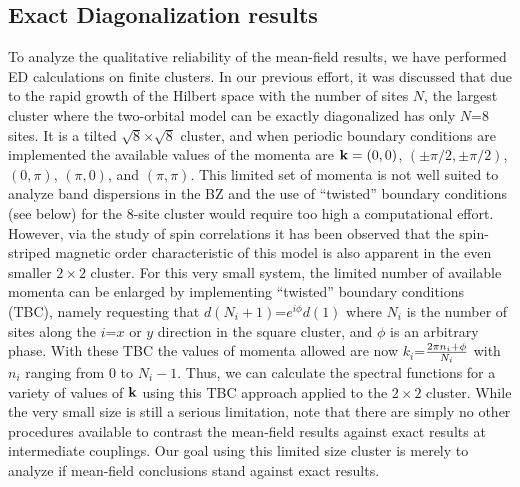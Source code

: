 \documentclass[aps,prb,superscriptaddress,preprintnumbers,
showpacs,legalpaper,twoside,twocolumn,amsmath,amssymb]{revtex4}
\begin{document}
\subsection{Exact Diagonalization results}

To analyze the qualitative reliability of the mean-field results, we have performed
ED calculations on finite clusters. In our previous effort,\cite{daghofer}
it was discussed that due to the rapid growth of the
Hilbert space with the number of sites $N$, the largest cluster where
the two-orbital model can be exactly diagonalized has only $N$=$8$ sites. It is a tilted
$\sqrt{8}$$\times$$\sqrt{8}$ cluster, and when periodic
boundary conditions are implemented the available values
of the momenta are ${\bf k}=(0,0)$, $(\pm\pi/2,\pm\pi/2)$, $(0,\pi)$,
$(\pi,0)$, and $(\pi,\pi)$. This limited set of momenta
is not well suited to analyze band
dispersions in the BZ and the use of ``twisted'' boundary conditions  (see below)
for the 8-site cluster would require too high a computational effort.
However, via the study of spin correlations
it has been observed that the spin-striped magnetic order
characteristic of this model is also apparent in the even smaller $2\times 2$ cluster. For
this very small system, the limited number of available momenta can be enlarged by
implementing ``twisted'' boundary conditions (TBC), namely requesting
that $d(N_i+1)$=$e^{i\phi}d(1)$ where $N_i$ is the number of sites along the
$i$=$x$ or $y$ direction in the square cluster, and $\phi$ is an arbitrary phase.
With these TBC
the values of momenta allowed are now $k_i$=${2\pi n_i+\phi\over{N_i}}$ with $n_i$
ranging from 0 to $N_i-1$. Thus, we can calculate the spectral functions for
a variety of values of ${\bf k}$ using this TBC approach applied to the $2 \times 2$
cluster. While the very small size is still a serious limitation, note that
there are simply no other procedures
available to contrast the mean-field results against
exact results at intermediate couplings. Our goal using this limited size
cluster is merely to analyze if mean-field conclusions stand against exact results.

\end{document}
